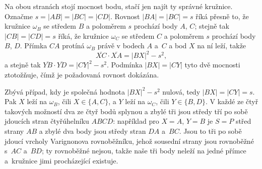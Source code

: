 {    Na obou stranách stojí mocnost bodu, stačí jen najít ty správné kružnice. Označme $s = |AB| = |BC| = |CD|$. Rovnost $|BA| = |BC| = s$ říká přesně to, že kružnice $\omega_B$ se středem $B$ a poloměrem $s$ prochází body $A$, $C$; stejně tak $|CB| = |CD| = s$ říká, že kružnice $\omega_C$ se středem $C$ a poloměrem $s$ prochází body $B$, $D$. Přímka $CA$ protíná $\omega_B$ právě v bodech $A$ a~$C$ a bod $X$ na ní leží, takže
    $$
    \overline{XC} \cdot \overline{XA} = |BX|^2 - s^2,
    $$
    a stejně tak $\overline{YB} \cdot \overline{YD} = |CY|^2 - s^2$. Podmínka $|BX| = |CY|$ tyto dvě mocnosti ztotožňuje, čímž je požadovaná rovnost dokázána.

    Zbývá případ, kdy je společná hodnota $|BX|^2 - s^2$ nulová, tedy $|BX| = |CY| = s$. Pak $X$ leží na $\omega_B$, čili $X \in \{A, C\}$, a $Y$ leží na $\omega_C$, čili $Y \in \{B, D\}$. V každé ze čtyř takových možností dva ze čtyř bodů splynou a zbylé tři jsou středy tří po sobě jdoucích stran čtyřúhelníku $ABCD$: například pro $X = A$, $Y = B$ je $S = P$ střed strany $AB$ a zbylé dva body jsou středy stran $DA$ a~$BC$. Jsou to tři po sobě jdoucí vrcholy Varignonova rovnoběžníku, jehož sousední strany jsou rovnoběžné s~$AC$ a~$BD$; ty rovnoběžné nejsou, takže naše tři body neleží na jedné přímce a~kružnice jimi procházející existuje.
}

